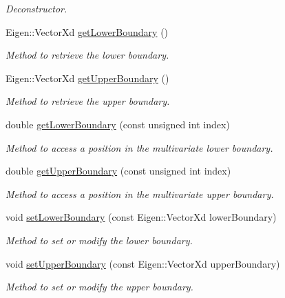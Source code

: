 \begin{DoxyCompactItemize}
\begin{DoxyCompactList}\small\item\em Deconstructor. \end{DoxyCompactList}\item 
Eigen\+::\+Vector\+Xd \hyperlink{structtudat_1_1optimization_1_1Boundaries_aed0ba0658b4383b2401b5cea4927a914}{get\+Lower\+Boundary} ()
\begin{DoxyCompactList}\small\item\em Method to retrieve the lower boundary. \end{DoxyCompactList}\item 
Eigen\+::\+Vector\+Xd \hyperlink{structtudat_1_1optimization_1_1Boundaries_a2cf6c22afe7ed1f648b5cf1bb15202e1}{get\+Upper\+Boundary} ()
\begin{DoxyCompactList}\small\item\em Method to retrieve the upper boundary. \end{DoxyCompactList}\item 
double \hyperlink{structtudat_1_1optimization_1_1Boundaries_aa860b659dfcf583c5d8abcf714304864}{get\+Lower\+Boundary} (const unsigned int index)
\begin{DoxyCompactList}\small\item\em Method to access a position in the multivariate lower boundary. \end{DoxyCompactList}\item 
double \hyperlink{structtudat_1_1optimization_1_1Boundaries_a2616d1c8a4c8dafbf8265c2fd1f670ff}{get\+Upper\+Boundary} (const unsigned int index)
\begin{DoxyCompactList}\small\item\em Method to access a position in the multivariate upper boundary. \end{DoxyCompactList}\item 
void \hyperlink{structtudat_1_1optimization_1_1Boundaries_aea53e6e84b3b5e855d1ca8bc3a90f67f}{set\+Lower\+Boundary} (const Eigen\+::\+Vector\+Xd lower\+Boundary)
\begin{DoxyCompactList}\small\item\em Method to set or modify the lower boundary. \end{DoxyCompactList}\item 
void \hyperlink{structtudat_1_1optimization_1_1Boundaries_ad1c3faf390cc08fdb9d04028c489dc9b}{set\+Upper\+Boundary} (const Eigen\+::\+Vector\+Xd upper\+Boundary)
\begin{DoxyCompactList}\small\item\em Method to set or modify the upper boundary. \end{DoxyCompactList}\end{DoxyCompactItemize}



